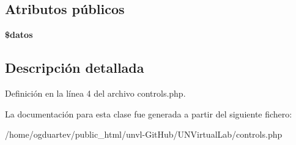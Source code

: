 \subsection*{Atributos públicos}
\begin{DoxyCompactItemize}
\item 
\mbox{\label{classcontrols_abda28107af4943a229e1346924684183}} 
{\bfseries \$datos}
\end{DoxyCompactItemize}


\subsection{Descripción detallada}


Definición en la línea 4 del archivo controls.\+php.



La documentación para esta clase fue generada a partir del siguiente fichero\+:\begin{DoxyCompactItemize}
\item 
/home/ogduartev/public\+\_\+html/unvl-\/\+Git\+Hub/\+U\+N\+Virtual\+Lab/controls.\+php\end{DoxyCompactItemize}
